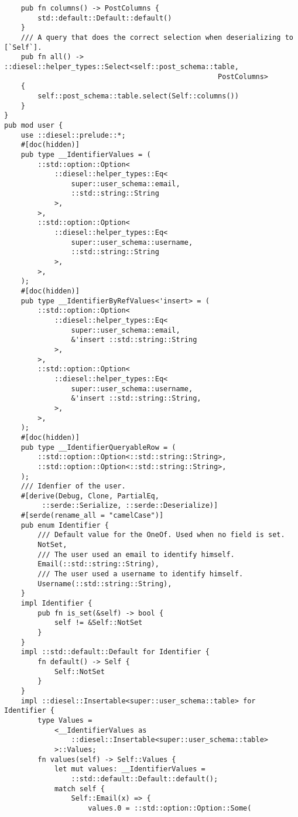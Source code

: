 \begin{verbatim}
    pub fn columns() -> PostColumns {
        std::default::Default::default()
    }
    /// A query that does the correct selection when deserializing to [`Self`].
    pub fn all() -> ::diesel::helper_types::Select<self::post_schema::table,
                                                   PostColumns>
    {
        self::post_schema::table.select(Self::columns())
    }
}
pub mod user {
    use ::diesel::prelude::*;
    #[doc(hidden)]
    pub type __IdentifierValues = (
        ::std::option::Option<
            ::diesel::helper_types::Eq<
                super::user_schema::email,
                ::std::string::String
            >,
        >,
        ::std::option::Option<
            ::diesel::helper_types::Eq<
                super::user_schema::username,
                ::std::string::String
            >,
        >,
    );
    #[doc(hidden)]
    pub type __IdentifierByRefValues<'insert> = (
        ::std::option::Option<
            ::diesel::helper_types::Eq<
                super::user_schema::email,
                &'insert ::std::string::String
            >,
        >,
        ::std::option::Option<
            ::diesel::helper_types::Eq<
                super::user_schema::username,
                &'insert ::std::string::String,
            >,
        >,
    );
    #[doc(hidden)]
    pub type __IdentifierQueryableRow = (
        ::std::option::Option<::std::string::String>,
        ::std::option::Option<::std::string::String>,
    );
    /// Idenfier of the user.
    #[derive(Debug, Clone, PartialEq,
         ::serde::Serialize, ::serde::Deserialize)]
    #[serde(rename_all = "camelCase")]
    pub enum Identifier {
        /// Default value for the OneOf. Used when no field is set.
        NotSet,
        /// The user used an email to identify himself.
        Email(::std::string::String),
        /// The user used a username to identify himself.
        Username(::std::string::String),
    }
    impl Identifier {
        pub fn is_set(&self) -> bool {
            self != &Self::NotSet
        }
    }
    impl ::std::default::Default for Identifier {
        fn default() -> Self {
            Self::NotSet
        }
    }
    impl ::diesel::Insertable<super::user_schema::table> for Identifier {
        type Values =
            <__IdentifierValues as
                ::diesel::Insertable<super::user_schema::table>
            >::Values;
        fn values(self) -> Self::Values {
            let mut values: __IdentifierValues =
                ::std::default::Default::default();
            match self {
                Self::Email(x) => {
                    values.0 = ::std::option::Option::Some(

\end{verbatim}
